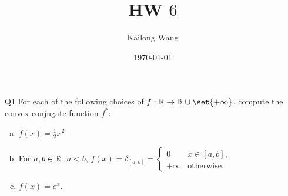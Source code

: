 \documentclass{article}
\title{HW $6$}
\author{Kailong Wang}
\date{\today}
\begin{document}
\maketitle

\begin{problem}
    {Q1}
    For each of the following choices of $f:\R\rightarrow \R \cup \set{+\infty}$, compute the convex conjugate function $f^*$:
    \begin{enumerate}[(a)]
        \item $f(x)=\frac{1}{2}x^2$.
        \item For $a ,b\in\mathbb{R}$, $a<b$, ${
            f(x)=\delta_{[a, b]}= \begin{cases}
                0 & x\in [a, b],\\
                +\infty & \text{otherwise}.
            \end{cases}
            }$
        \item $f(x)=e^x$.
    \end{enumerate}
\end{problem}
\end{document}
